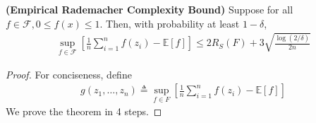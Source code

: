\documentclass{article}
\newcommand{\bfs}[1]{\textbf{({#1}) }}
\begin{document}
\begin{thma}\bfs{Empirical Rademacher Complexity Bound}\label{thma:ddchffe}
Suppose for all $f \in \mathcal{F}, 0 \leq f(x) \leq 1$. Then, with probability at least $1-\delta$,
\begin{align*}
\sup _{f \in \mathcal{F}}\left[\frac{1}{n} \sum_{i=1}^{n} f\left(z_{i}\right)-\mathbb{E}[f]\right] \leq 2 R_{S}(F)+3 \sqrt{\frac{\log (2 / \delta)}{2 n}}
\end{align*}
\end{thma}
\begin{proof}
 For conciseness, define
\begin{align*}
g\left(z_{1}, \ldots, z_{n}\right) \triangleq \sup _{f \in F}\left[\frac{1}{n} \sum_{i=1}^{n} f\left(z_{i}\right)-\mathbb{E}[f]\right]
\end{align*}
We prove the theorem in 4 steps.


\end{proof}
\end{document}
